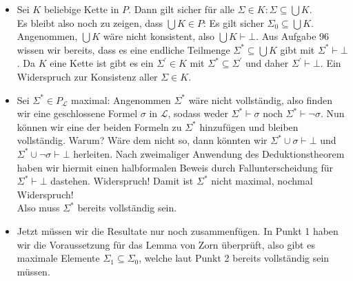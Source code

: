 \begin{solution}
\phantom{}
\begin{itemize}
  \item Sei $K$ beliebige Kette in $P$. Dann gilt sicher für alle
  $\Sigma \in K: \Sigma \subseteq \bigcup K$. \\
  Es bleibt also noch zu zeigen, dass $\bigcup K \in P$:
  Es gilt sicher $\Sigma_0 \subseteq \bigcup K$. \\
  Angenommen, $\bigcup K$
  wäre nicht konsistent, also $\bigcup K \vdash \bot$. Aus Aufgabe 96 wissen wir bereits, dass es eine endliche Teilmenge $\Sigma^\ast \subseteq \bigcup K$ gibt mit $\Sigma^\ast \vdash \bot$. Da $K$ eine Kette ist gibt es ein $\Sigma^\prime \in K$ mit $\Sigma^\ast \subseteq \Sigma^\prime$ und daher $\Sigma^\prime \vdash \bot$. Ein Widerspruch zur Konsistenz aller $\Sigma \in K$. 
  \item Sei $\Sigma^* \in P_{\mathscr{L}}$ maximal: Angenommen $\Sigma^*$ wäre nicht vollständig,
  also finden wir eine geschlossene Formel $\sigma$ in $\mathscr{L}$, sodass weder
  $\Sigma^* \vdash \sigma$ noch $\Sigma^* \vdash \neg \sigma$. Nun können wir eine
  der beiden Formeln zu $\Sigma^*$ hinzufügen und bleiben vollständig. Warum?
  Wäre dem nicht so, dann könnten wir $\Sigma^* \cup \sigma \vdash \bot$
  und $\Sigma^* \cup \neg \sigma \vdash \bot$ herleiten. Nach zweimaliger
  Anwendung des Deduktionstheorem haben wir hiermit einen halbformalen Beweis
  durch Fallunterscheidung für $\Sigma^* \vdash \bot$ dastehen. Widerspruch!
  Damit ist $\Sigma^*$ nicht maximal, nochmal Widerspruch! \\
  Also muss $\Sigma^*$ bereits vollständig sein.
  \item Jetzt müssen wir die Resultate nur noch zusammenfügen. In Punkt 1
  haben wir die Voraussetzung für das Lemma von Zorn überprüft, also
  gibt es maximale Elemente $\Sigma_1 \subseteq \Sigma_0$, welche laut Punkt 2
  bereits vollständig sein müssen.

\end{itemize}

\end{solution}

